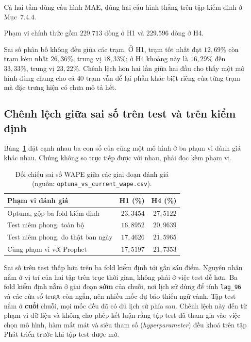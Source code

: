 Cả hai tầm dùng cấu hình MAE, đúng hai cấu hình thắng trên tập kiểm định ở Mục~$7.4.4$.

Phạm vi chính thức gồm $229.713$ dòng ở H1 và $229.596$ dòng ở H4.

Sai số phân bố không đều giữa các trạm. Ở H1, trạm tốt nhất đạt $12{,}69\%$ còn trạm kém nhất
$26{,}36\%$, trung vị $18{,}33\%$; ở H4 khoảng này là $16{,}29\%$ đến $33{,}33\%$, trung vị
$23{,}22\%$. Chênh lệch hơn hai lần giữa hai đầu cho thấy một mô hình dùng chung cho cả $40$
trạm vẫn để lại phần khác biệt riêng của từng trạm mà đặc trưng hiện có chưa mô tả hết.

\FloatBarrier
\subsection{Chênh lệch giữa sai số trên test và trên kiểm định}

Bảng~\ref{tab:ba_pham_vi} đặt cạnh nhau ba con số của cùng một mô hình ở ba phạm vi đánh giá
khác nhau. Chúng không so trực tiếp được với nhau, phải đọc kèm phạm vi.

\begin{table}[htbp]
\centering
\caption{Đối chiếu sai số WAPE giữa các giai đoạn đánh giá (nguồn: \texttt{optuna\_vs\_current\_wape.csv}).}
\label{tab:ba_pham_vi}
\small
\begin{tabular}{l r r}
\toprule
\textbf{Phạm vi đánh giá} & \textbf{H1 (\%)} & \textbf{H4 (\%)} \\
\midrule
Optuna, gộp ba fold kiểm định   & $23{,}3454$ & $27{,}5122$ \\
Test niêm phong, toàn bộ        & $16{,}8952$ & $20{,}9639$ \\
Test niêm phong, đo thật ban ngày & $17{,}4626$ & $21{,}5965$ \\
Cùng phạm vi với Prophet        & $17{,}5197$ & $21{,}7353$ \\
\bottomrule
\end{tabular}
\end{table}

Sai số trên test thấp hơn trên ba fold kiểm định tới gần sáu điểm. Nguyên nhân nằm ở vị trí của
hai tập trên trục thời gian, không phải ở việc test dễ hơn. Ba fold kiểm định nằm ở giai đoạn
\textbf{sớm} của chuỗi, nơi lịch sử dùng để tính \texttt{lag\_96} và các cửa sổ trượt còn ngắn, nên
nhiều mốc dự báo thiếu ngữ cảnh. Tập test nằm ở \textbf{cuối} chuỗi, mọi mốc đều đã có đủ lịch
sử phía sau. Chênh lệch này đến từ phạm vi dữ liệu và không cho phép kết luận rằng tập test đã
tham gia vào việc chọn mô hình, hàm mất mát và siêu tham số (\textit{hyperparameter}) đều khoá trên tập Phát triển
trước khi tập test được mở.

